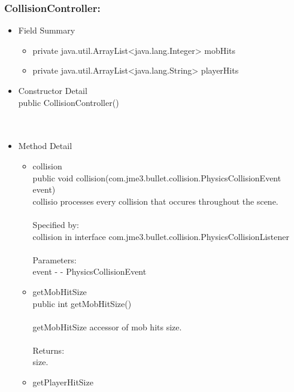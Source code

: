 \documentclass[letterpaper]{article}
\begin{document}
							\subsubsection*{CollisionController:}
							\vspace{0.1in}	
								\begin{itemize}
									\item	Field Summary
											\begin{itemize}
												\item	private java.util.ArrayList<java.lang.Integer>	mobHits 
												\item	private java.util.ArrayList<java.lang.String>	playerHits 
											\end{itemize}
									\item	Constructor Detail \\
											public CollisionController() \\ \\ \\
									\item	Method Detail
											\begin{itemize}
												\item	collision \\
														public void collision(com.jme3.bullet.collision.PhysicsCollisionEvent event) \\
														collisio processes every collision that occures throughout the scene. \\ \\
														Specified by: \\
														collision in interface com.jme3.bullet.collision.PhysicsCollisionListener \\ \\
														Parameters: \\
														event - - PhysicsCollisionEvent \\
												\item	getMobHitSize \\
														public int getMobHitSize() \\ \\
														getMobHitSize accessor of mob hits size. \\ \\
														Returns: \\
														size. \\
												\item	getPlayerHitSize \\

\end{itemize}
\end{itemize}
\end{document}
